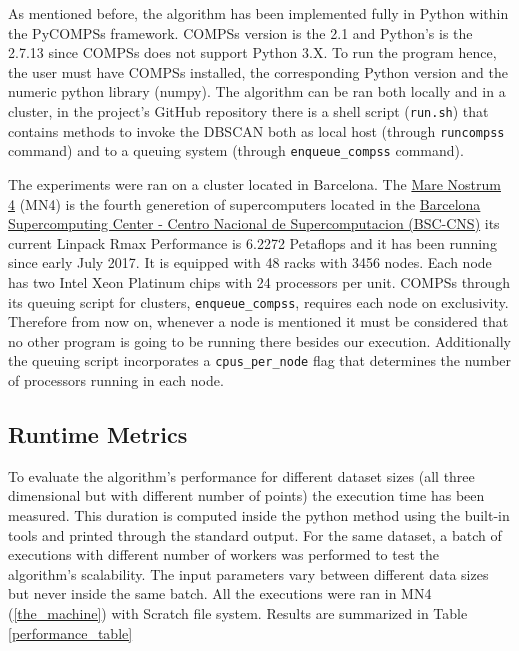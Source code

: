 \documentclass[10pt,journal,compsoc]{IEEEtran}
\begin{document}
As mentioned before, the algorithm has been implemented fully in Python within the PyCOMPSs framework. COMPSs version is the 2.1 and Python's is the 2.7.13 since COMPSs does not support Python 3.X. To run the program hence, the user must have COMPSs installed, the corresponding Python version and the numeric python library (numpy). The algorithm can be ran both locally and in a cluster, in the project's GitHub repository there is a shell script (\texttt{run.sh}) that contains methods to invoke the DBSCAN both as local host (through \texttt{runcompss} command) and to a queuing system (through \texttt{enqueue\_compss} command). 

The experiments were ran on a cluster located in Barcelona. The \href{https://www.bsc.es/user-support/mn4.php#systemoverview}{Mare Nostrum 4} (MN4) is the fourth generetion of supercomputers located in the \href{https://www.bsc.es}{Barcelona Supercomputing Center - Centro Nacional de Supercomputacion (BSC-CNS)} its current Linpack Rmax Performance is 6.2272 Petaflops and it has been running since early July 2017. It is equipped with 48 racks with 3456 nodes. Each node has two Intel Xeon Platinum chips with 24 processors per unit. COMPSs through its queuing script for clusters, \texttt{enqueue\_compss}, requires each node on exclusivity. Therefore from now on, whenever a node is mentioned it must be considered that no other program is going to be running there besides our execution. Additionally the queuing script incorporates a \texttt{cpus\_per\_node} flag that determines the number of processors running in each node.

\subsection{Runtime Metrics} \label{subsec:metrics}

To evaluate the algorithm's performance for different dataset sizes (all three dimensional but with different number of points) the execution time has been measured. This duration is computed inside the python method using the built-in tools and printed through the standard output. For the same dataset, a batch of executions with different number of workers was performed to test the algorithm's scalability. The input parameters vary between different data sizes but never inside the same batch. All the executions were ran in MN4 (\ref{the_machine}) with Scratch file system. Results are summarized in Table \ref{performance_table}
\end{document}
